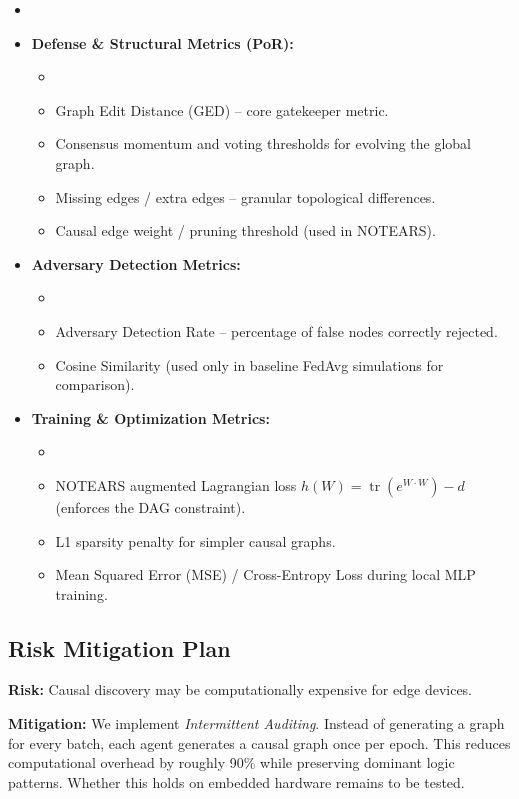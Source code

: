 \documentclass[journal]{IEEEtran}
\begin{document}
\begin{itemize}
\item  \item \textbf{Defense \& Structural Metrics (PoR):}
 \begin{itemize}
\item  \item Graph Edit Distance (GED) – core gatekeeper metric. \item Consensus momentum and voting thresholds for evolving the global graph. \item Missing edges / extra edges – granular topological differences. \item Causal edge weight / pruning threshold (used in NOTEARS). \end{itemize}
 \item \textbf{Adversary Detection Metrics:}
 \begin{itemize}
\item  \item Adversary Detection Rate – percentage of false nodes correctly rejected. \item Cosine Similarity (used only in baseline FedAvg simulations for comparison). \end{itemize}
 \item \textbf{Training \& Optimization Metrics:}
 \begin{itemize}
\item  \item NOTEARS augmented Lagrangian loss $h(W) = \operatorname{tr}(e^{W \cdot W}) - d$ (enforces the DAG constraint). \item L1 sparsity penalty for simpler causal graphs. \item Mean Squared Error (MSE) / Cross-Entropy Loss during local MLP training. \end{itemize}
\end{itemize}

\subsection{Risk Mitigation Plan}

\textbf{Risk:} Causal discovery may be computationally expensive for edge devices.

\textbf{Mitigation:} We implement \emph{Intermittent Auditing}. Instead of generating a graph for every batch, each agent generates a causal graph once per epoch. This reduces computational overhead by roughly 90\% while preserving dominant logic patterns. Whether this holds on embedded hardware remains to be tested.
\end{document}
